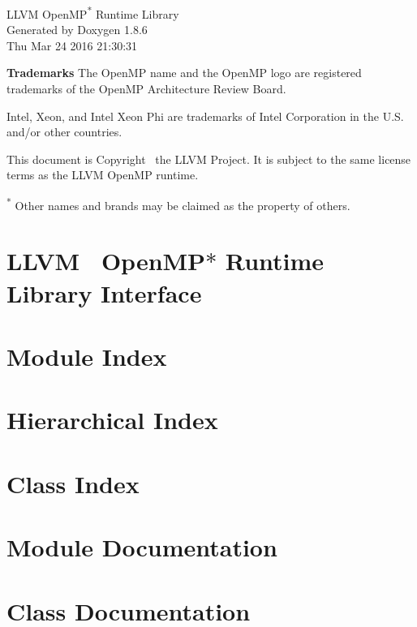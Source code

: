 \documentclass{book}
\begin{document}
\hypersetup{pageanchor=false,citecolor=blue}
\begin{titlepage}
\vspace*{7cm}
\begin{center}
{\Large LLVM OpenMP\textsuperscript{*} Runtime Library }\\
\vspace*{1cm}
{\large Generated by Doxygen 1.8.6 }\\
\vspace*{0.5cm}
{\small Thu Mar 24 2016 21:30:31 }\\
\end{center}
\end{titlepage}

{\bf Trademarks}
The OpenMP name and the OpenMP logo are registered trademarks of the OpenMP Architecture Review Board.

Intel, Xeon, and Intel Xeon Phi are trademarks of Intel Corporation in the U.S. and/or other countries.

This document is Copyright \textcopyright~\the\year the LLVM Project. It is
subject to the same license terms as the LLVM OpenMP runtime.
 
\textsuperscript{*} Other names and brands may be claimed as the property of others.

\clearemptydoublepage
{}
\tableofcontents
\clearemptydoublepage
{}
\hypersetup{pageanchor=true,citecolor=blue}
\chapter{L\-L\-V\-M~ Open\-M\-P$\ast$ Runtime Library Interface}
\label{index}\hypertarget{index}{}
\chapter{Module Index}

\chapter{Hierarchical Index}

\chapter{Class Index}

\chapter{Module Documentation}













\chapter{Class Documentation}




\newpage
{}
{}
\printindex
\end{document}

